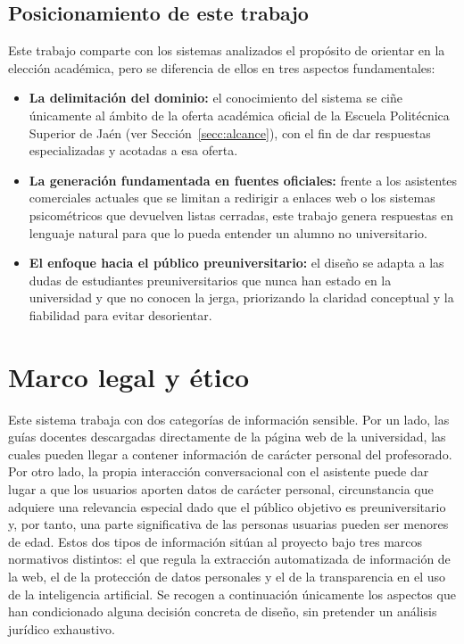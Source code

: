 \subsection{Posicionamiento de este trabajo}
\label{secc:posicionamiento}

Este trabajo comparte con los sistemas analizados el propósito de orientar en la elección académica, pero se diferencia de ellos en tres aspectos fundamentales:
\begin{itemize}
  \item \textbf{La delimitación del dominio:} el conocimiento del sistema se ciñe únicamente al ámbito de la oferta académica oficial de la Escuela Politécnica Superior de Jaén (ver Sección~\ref{secc:alcance}), con el fin de dar respuestas especializadas y acotadas a esa oferta.
  \item \textbf{La generación fundamentada en fuentes oficiales:} frente a los asistentes comerciales actuales que se limitan a redirigir a enlaces web o los sistemas psicométricos que devuelven listas cerradas, este trabajo genera respuestas en lenguaje natural para que lo pueda entender un alumno no universitario.
  \item \textbf{El enfoque hacia el público preuniversitario:} el diseño se adapta a las dudas de estudiantes preuniversitarios que nunca han estado en la universidad y que no conocen la jerga, priorizando la claridad conceptual y la fiabilidad para evitar desorientar.
\end{itemize}
\section{Marco legal y ético}
\label{secc:marcolegal}

Este sistema trabaja con dos categorías de información sensible. Por un lado, las guías docentes descargadas directamente de la página web de la universidad, las cuales pueden llegar a contener información de carácter personal del profesorado. Por otro lado, la propia interacción conversacional con el asistente puede dar lugar a que los usuarios aporten datos de carácter personal, circunstancia que adquiere una relevancia especial dado que el público objetivo es preuniversitario y, por tanto, una parte significativa de las personas usuarias pueden ser menores de edad. Estos dos tipos de información sitúan al proyecto bajo tres marcos normativos distintos: el que regula la extracción automatizada de información de la web, el de la protección de datos personales y el de la transparencia en el uso de la inteligencia artificial. Se recogen a continuación únicamente los aspectos que han condicionado alguna decisión concreta de diseño, sin pretender un análisis jurídico exhaustivo.

